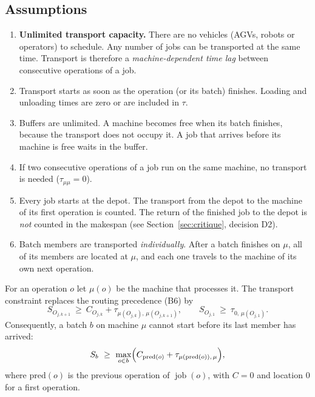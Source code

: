 \documentclass[11pt,a4paper]{article}
\newcommand{\job}{\operatorname{job}}
\begin{document}
\subsection{Assumptions}
\begin{enumerate}[label=(T\arabic*)]
  \item \label{T:unlimited}\textbf{Unlimited transport capacity.} There are no
    vehicles (AGVs, robots or operators) to schedule. Any number of jobs can be
    transported at the same time. Transport is therefore a
    \emph{machine-dependent time lag} between consecutive operations of a job.
  \item \label{T:immediate}Transport starts as soon as the operation (or its
    batch) finishes. Loading and unloading times are zero or are included in $\tau$.
  \item \label{T:buffer}Buffers are unlimited. A machine becomes free when its
    batch finishes, because the transport does not occupy it. A job that arrives
    before its machine is free waits in the buffer.
  \item \label{T:same}If two consecutive operations of a job run on the same
    machine, no transport is needed ($\tau_{\mu\mu}=0$).
  \item \label{T:depot}Every job starts at the depot. The transport from the
    depot to the machine of its first operation is counted. The return of the
    finished job to the depot is \emph{not} counted in the makespan (see
    Section~\ref{sec:critique}, decision D2).
  \item \label{T:batch}Batch members are transported \emph{individually}. After
    a batch finishes on $\mu$, all of its members are located at $\mu$, and each
    one travels to the machine of its own next operation.
\end{enumerate}

For an operation $o$ let $\mu(o)$ be the machine that processes it. The
transport constraint replaces the routing precedence (B6) by
\begin{equation}
  S_{O_{j,k+1}}\ \ge\ C_{O_{j,k}}+\tau_{\mu(O_{j,k}),\,\mu(O_{j,k+1})},
  \qquad
  S_{O_{j,1}}\ \ge\ \tau_{0,\,\mu(O_{j,1})}.
  \label{eq:transport}
\end{equation}
Consequently, a batch $b$ on machine $\mu$ cannot start before its last member
has arrived:
\begin{equation}
  S_b\ \ge\ \max_{o\in b}\Bigl(C_{\mathrm{pred}(o)}+\tau_{\mu(\mathrm{pred}(o)),\,\mu}\Bigr),
  \label{eq:batcharrival}
\end{equation}
where $\mathrm{pred}(o)$ is the previous operation of $\job(o)$, with $C=0$ and
location $0$ for a first operation.
\end{document}
